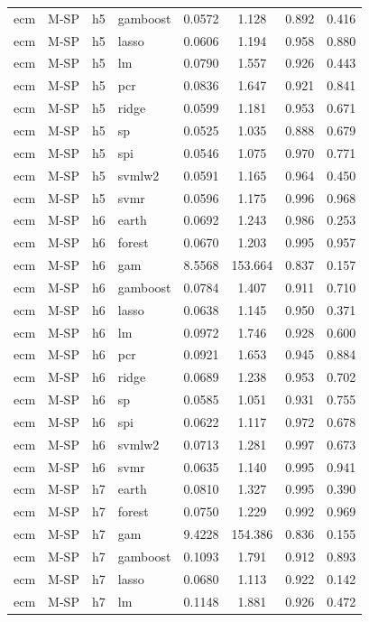 \begin{ThreePartTable}
\begin{longtable}[t]{llclcccc}
ecm & M-SP & h5 & gamboost & 0.0572 & 1.128 & 0.892 & 0.416\\
ecm & M-SP & h5 & lasso & 0.0606 & 1.194 & 0.958 & 0.880\\
ecm & M-SP & h5 & lm & 0.0790 & 1.557 & 0.926 & 0.443\\
ecm & M-SP & h5 & pcr & 0.0836 & 1.647 & 0.921 & 0.841\\
ecm & M-SP & h5 & ridge & 0.0599 & 1.181 & 0.953 & 0.671\\
ecm & M-SP & h5 & sp & 0.0525 & 1.035 & 0.888 & 0.679\\
ecm & M-SP & h5 & spi & 0.0546 & 1.075 & 0.970 & 0.771\\
ecm & M-SP & h5 & svmlw2 & 0.0591 & 1.165 & 0.964 & 0.450\\
ecm & M-SP & h5 & svmr & 0.0596 & 1.175 & 0.996 & 0.968\\
\addlinespace
ecm & M-SP & h6 & earth & 0.0692 & 1.243 & 0.986 & 0.253\\
ecm & M-SP & h6 & forest & 0.0670 & 1.203 & 0.995 & 0.957\\
ecm & M-SP & h6 & gam & 8.5568 & 153.664 & 0.837 & 0.157\\
ecm & M-SP & h6 & gamboost & 0.0784 & 1.407 & 0.911 & 0.710\\
ecm & M-SP & h6 & lasso & 0.0638 & 1.145 & 0.950 & 0.371\\
ecm & M-SP & h6 & lm & 0.0972 & 1.746 & 0.928 & 0.600\\
ecm & M-SP & h6 & pcr & 0.0921 & 1.653 & 0.945 & 0.884\\
ecm & M-SP & h6 & ridge & 0.0689 & 1.238 & 0.953 & 0.702\\
ecm & M-SP & h6 & sp & 0.0585 & 1.051 & 0.931 & 0.755\\
ecm & M-SP & h6 & spi & 0.0622 & 1.117 & 0.972 & 0.678\\
ecm & M-SP & h6 & svmlw2 & 0.0713 & 1.281 & 0.997 & 0.673\\
ecm & M-SP & h6 & svmr & 0.0635 & 1.140 & 0.995 & 0.941\\
\addlinespace
ecm & M-SP & h7 & earth & 0.0810 & 1.327 & 0.995 & 0.390\\
ecm & M-SP & h7 & forest & 0.0750 & 1.229 & 0.992 & 0.969\\
ecm & M-SP & h7 & gam & 9.4228 & 154.386 & 0.836 & 0.155\\
ecm & M-SP & h7 & gamboost & 0.1093 & 1.791 & 0.912 & 0.893\\
ecm & M-SP & h7 & lasso & 0.0680 & 1.113 & 0.922 & 0.142\\
ecm & M-SP & h7 & lm & 0.1148 & 1.881 & 0.926 & 0.472\\

\end{longtable}
\end{ThreePartTable}
